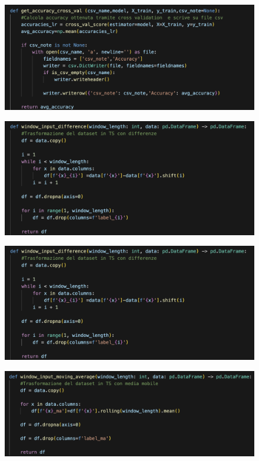 \begin{appendices}
\begin{figure}[H]
    \centering
    \includegraphics[width=1\linewidth]{9.png}
    \label{fig:enter-label}
\end{figure}

\begin{figure}[H]
    \centering
    \includegraphics[width=1\linewidth]{10.png}
    \label{fig:enter-label}
\end{figure}

\begin{figure}[H]
    \centering
    \includegraphics[width=1\linewidth]{10.png}
    \label{fig:enter-label}
\end{figure}

\begin{figure}[H]
    \centering
    \includegraphics[width=1\linewidth]{11.png}
    \label{fig:enter-label}
\end{figure}


\end{appendices}
